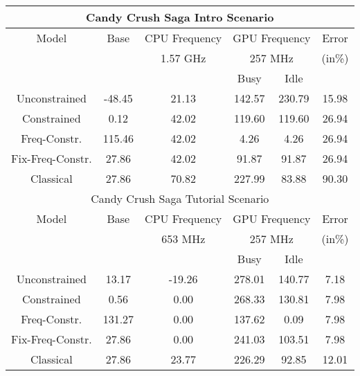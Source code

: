 \begin{table}[]
{\begin{tabular}{|c|c|c|c|c|c|}
    \multicolumn{6}{|c|}{Candy Crush Saga Intro Scenario} \\
        \hline
        Model & Base & \multicolumn{1}{c|}{CPU Frequency} & \multicolumn{2}{c|}{GPU Frequency} & Error \\
        \cline{3-5}
        &  & 1.57 GHz & \multicolumn{2}{c|}{257 MHz} & (in\%) \\
        \cline{3-5}
                & & \multicolumn{1}{|c|}{} & Busy & Idle & \\
        \hline
        Unconstrained & -48.45 & 21.13 & 142.57 & 230.79 & 15.98 \\
        Constrained & 0.12 & 42.02 & 119.60 & 119.60 & 26.94 \\
        Freq-Constr. & 115.46 & 42.02 & 4.26 & 4.26 & 26.94 \\
        Fix-Freq-Constr. & 27.86 & 42.02 & 91.87 & 91.87 & 26.94 \\
        \hline
        Classical & 27.86 & 70.82 & 227.99 & 83.88 & 90.30 \\
        \hline

    \multicolumn{6}{|c|}{Candy Crush Saga Tutorial Scenario} \\
        \hline
        Model & Base & \multicolumn{1}{c|}{CPU Frequency} & \multicolumn{2}{c|}{GPU Frequency} & Error \\
        \cline{3-5}
        &  & 653 MHz & \multicolumn{2}{c|}{257 MHz} & (in\%) \\
        \cline{3-5}
                & & \multicolumn{1}{|c|}{} & Busy & Idle & \\
        \hline
        Unconstrained & 13.17 & -19.26 & 278.01 & 140.77 & 7.18 \\
        Constrained & 0.56 & 0.00 & 268.33 & 130.81 & 7.98 \\
        Freq-Constr. & 131.27 & 0.00 & 137.62 & 0.09 & 7.98 \\
        Fix-Freq-Constr. & 27.86 & 0.00 & 241.03 & 103.51 & 7.98 \\
        \hline
        Classical & 27.86 & 23.77 & 226.29 & 92.85 & 12.01 \\
        \hline

\end{tabular}
\label{tab:nano_a}
}
\vspace{-0.1in}
\end{table}

